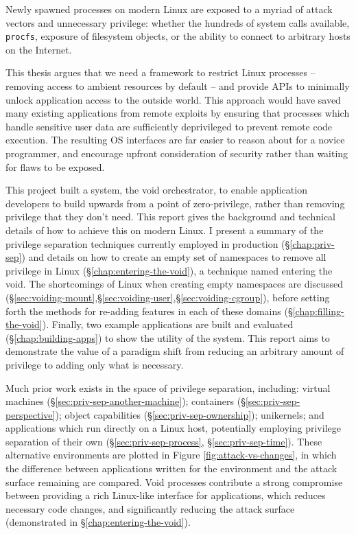 \documentclass[12pt,a4paper,twoside]{report}
\begin{document}
Newly spawned processes on modern Linux are exposed to a myriad of attack vectors and unnecessary privilege: whether the hundreds of system calls available, \texttt{procfs}, exposure of filesystem objects, or the ability to connect to arbitrary hosts on the Internet.

This thesis argues that we need a framework to restrict Linux processes -- removing access to ambient resources by default -- and provide APIs to minimally unlock application access to the outside world. This approach would have saved many existing applications from remote exploits by ensuring that processes which handle sensitive user data are sufficiently deprivileged to prevent remote code execution.  The resulting OS interfaces are far easier to reason about for a novice programmer, and encourage upfront consideration of security rather than waiting for flaws to be exposed.

This project built a system, the void orchestrator, to enable application developers to build upwards from a point of zero-privilege, rather than removing privilege that they don't need. This report gives the background and technical details of how to achieve this on modern Linux. I present a summary of the privilege separation techniques currently employed in production (§\ref{chap:priv-sep}) and details on how to create an empty set of namespaces to remove all privilege in Linux (§\ref{chap:entering-the-void}), a technique named entering the void. The shortcomings of Linux when creating empty namespaces are discussed (§\ref{sec:voiding-mount},§\ref{sec:voiding-user},§\ref{sec:voiding-cgroup}), before setting forth the methods for re-adding features in each of these domains (§\ref{chap:filling-the-void}). Finally, two example applications are built and evaluated (§\ref{chap:building-apps}) to show the utility of the system. This report aims to demonstrate the value of a paradigm shift from reducing an arbitrary amount of privilege to adding only what is necessary.

Much prior work exists in the space of privilege separation, including: virtual machines (§\ref{sec:priv-sep-another-machine}); containers (§\ref{sec:priv-sep-perspective}); object capabilities (§\ref{sec:priv-sep-ownership}); unikernels; and applications which run directly on a Linux host, potentially employing privilege separation of their own (§\ref{sec:priv-sep-process}, §\ref{sec:priv-sep-time}). These alternative environments are plotted in Figure \ref{fig:attack-vs-changes}, in which the difference between applications written for the environment and the attack surface remaining are compared. Void processes contribute a strong compromise between providing a rich Linux-like interface for applications, which reduces necessary code changes, and significantly reducing the attack surface (demonstrated in §\ref{chap:entering-the-void}).
\end{document}
